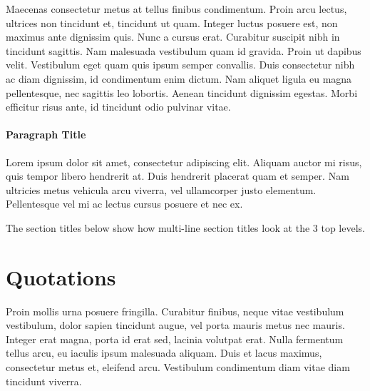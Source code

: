 \documentclass[
	a4paper, %
	12pt, %
]{include/CSSullivanBusinessReport}
\begin{document}
Maecenas consectetur metus at tellus finibus condimentum. Proin arcu lectus, ultrices non tincidunt et, tincidunt ut quam. Integer luctus posuere est, non maximus ante dignissim quis. Nunc a cursus erat. Curabitur suscipit nibh in tincidunt sagittis. Nam malesuada vestibulum quam id gravida. Proin ut dapibus velit. Vestibulum eget quam quis ipsum semper convallis. Duis consectetur nibh ac diam dignissim, id condimentum enim dictum. Nam aliquet ligula eu magna pellentesque, nec sagittis leo lobortis. Aenean tincidunt dignissim egestas. Morbi efficitur risus ante, id tincidunt odio pulvinar vitae.

\paragraph{Paragraph Title} %

Lorem ipsum dolor sit amet, consectetur adipiscing elit. Aliquam auctor mi risus, quis tempor libero hendrerit at. Duis hendrerit placerat quam et semper. Nam ultricies metus vehicula arcu viverra, vel ullamcorper justo elementum. Pellentesque vel mi ac lectus cursus posuere et nec ex.

The section titles below show how multi-line section titles look at the 3 top levels.



\section{Quotations}

Proin mollis urna posuere fringilla. Curabitur finibus, neque vitae vestibulum vestibulum, dolor sapien tincidunt augue, vel porta mauris metus nec mauris. Integer erat magna, porta id erat sed, lacinia volutpat erat. Nulla fermentum tellus arcu, eu iaculis ipsum malesuada aliquam. Duis et lacus maximus, consectetur metus et, eleifend arcu. Vestibulum condimentum diam vitae diam tincidunt viverra. %
\end{document}
